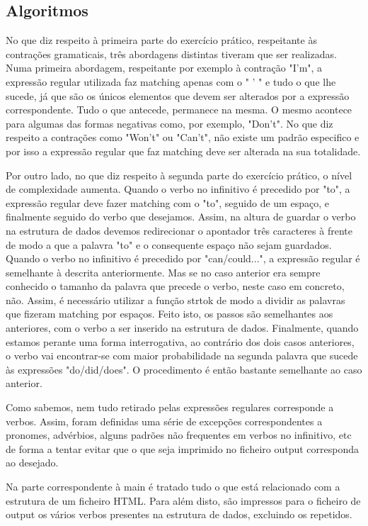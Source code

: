 \documentclass{report}
\begin{document}
\subsection{Algoritmos}
No que diz respeito à primeira parte do exercício prático, respeitante às contrações gramaticais, três abordagens distintas tiveram que ser realizadas. Numa primeira abordagem, respeitante por exemplo à contração "I'm", a expressão regular utilizada faz matching apenas com o " ' " e tudo o que lhe sucede, já que são os únicos elementos que devem ser alterados por a expressão correspondente. Tudo o que antecede, permanece na mesma. O mesmo acontece para algumas das formas negativas como, por exemplo, "Don't". No que diz respeito a contrações como "Won't" ou "Can't", não existe um padrão especifico e por isso a expressão regular que faz matching deve ser alterada na sua totalidade.

Por outro lado, no que diz respeito à segunda parte do exercício prático, o nível de complexidade aumenta. Quando o verbo no infinitivo é precedido por "to", a expressão regular deve fazer matching com o  "to", seguido de um espaço, e finalmente seguido do verbo que desejamos. Assim, na altura de guardar o verbo na estrutura de dados devemos redirecionar o apontador três caracteres à frente de modo a que a palavra "to" e o consequente espaço não sejam guardados. 
Quando o verbo no infinitivo é precedido por "can/could...", a expressão regular é semelhante à descrita anteriormente. Mas se no caso anterior era sempre conhecido o tamanho da palavra que precede o verbo, neste caso em concreto, não. Assim, é necessário utilizar a função strtok de modo a dividir as palavras que fizeram matching por espaços. Feito isto, os passos são semelhantes aos anteriores, com o verbo a ser inserido na estrutura de dados.
Finalmente, quando estamos perante uma forma interrogativa, ao contrário dos dois casos anteriores, o verbo vai encontrar-se com maior probabilidade na segunda palavra que sucede às expressões "do/did/does". O procedimento é então bastante semelhante ao caso anterior. 

Como sabemos, nem tudo retirado pelas expressões regulares corresponde a verbos. Assim, foram definidas uma série de excepções correspondentes a pronomes, advérbios, alguns padrões não frequentes em verbos no infinitivo, etc de forma a tentar evitar que o que seja imprimido no ficheiro output corresponda ao desejado.

Na parte correspondente à main é tratado tudo o que está relacionado com a estrutura de um ficheiro HTML. Para além disto, são impressos para o ficheiro de output os vários verbos presentes na estrutura de dados, excluindo os repetidos.
\end{document}
